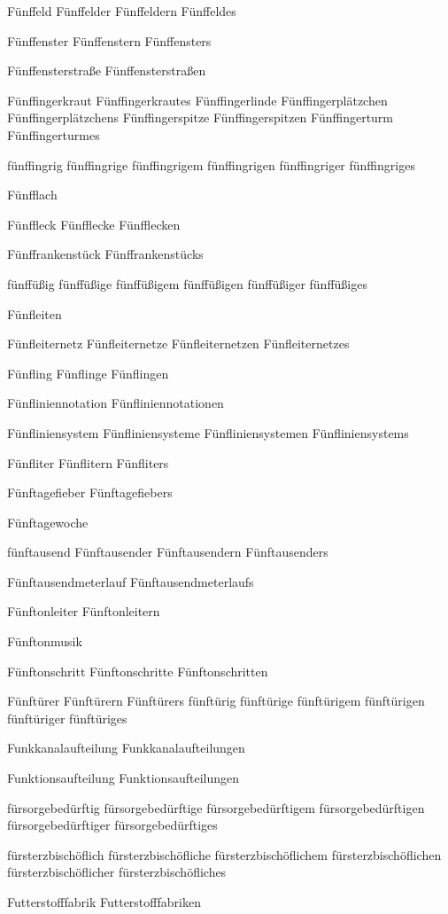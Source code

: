 Fünffeld
Fünffelder
Fünffeldern
Fünffeldes

Fünffenster
Fünffenstern
Fünffensters

Fünffensterstraße
Fünffensterstraßen

Fünffingerkraut
Fünffingerkrautes
Fünffingerlinde
Fünffingerplätzchen
Fünffingerplätzchens
Fünffingerspitze
Fünffingerspitzen
Fünffingerturm
Fünffingerturmes

fünffingrig
fünffingrige
fünffingrigem
fünffingrigen
fünffingriger
fünffingriges

Fünfflach

Fünffleck
Fünfflecke
Fünfflecken

Fünffrankenstück
Fünffrankenstücks

fünffüßig
fünffüßige
fünffüßigem
fünffüßigen
fünffüßiger
fünffüßiges

Fünfleiten

Fünfleiternetz
Fünfleiternetze
Fünfleiternetzen
Fünfleiternetzes

Fünfling
Fünflinge
Fünflingen

Fünfliniennotation
Fünfliniennotationen

Fünfliniensystem
Fünfliniensysteme
Fünfliniensystemen
Fünfliniensystems

Fünfliter
Fünflitern
Fünfliters

Fünftagefieber
Fünftagefiebers

Fünftagewoche

fünftausend
Fünftausender
Fünftausendern
Fünftausenders

Fünftausendmeterlauf
Fünftausendmeterlaufs

Fünftonleiter
Fünftonleitern

Fünftonmusik

Fünftonschritt
Fünftonschritte
Fünftonschritten

Fünftürer
Fünftürern
Fünftürers
fünftürig
fünftürige
fünftürigem
fünftürigen
fünftüriger
fünftüriges

Funkkanalaufteilung
Funkkanalaufteilungen

Funktionsaufteilung
Funktionsaufteilungen

fürsorgebedürftig
fürsorgebedürftige
fürsorgebedürftigem
fürsorgebedürftigen
fürsorgebedürftiger
fürsorgebedürftiges

fürsterzbischöflich
fürsterzbischöfliche
fürsterzbischöflichem
fürsterzbischöflichen
fürsterzbischöflicher
fürsterzbischöfliches

Futterstofffabrik
Futterstofffabriken

